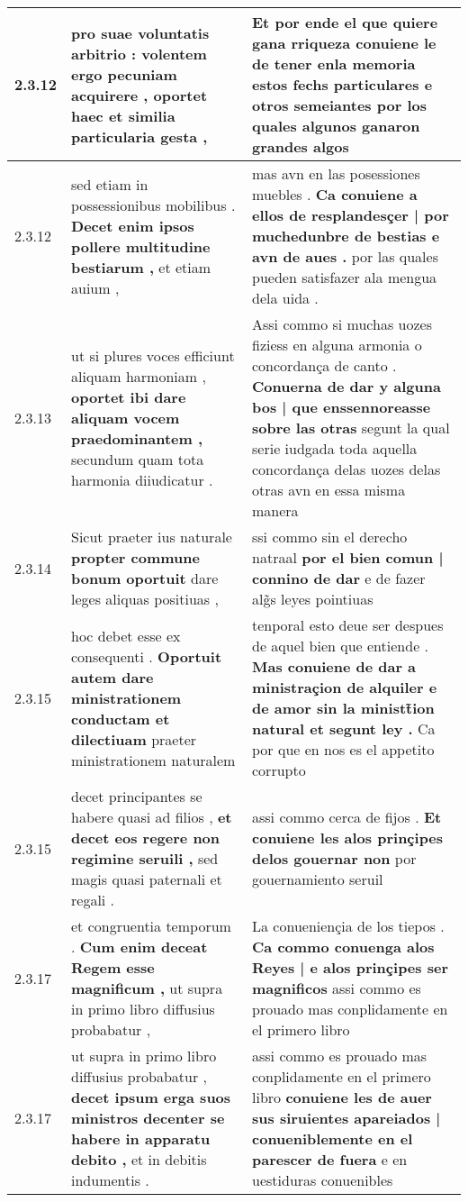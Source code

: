 \begin{tabular}{|p{1cm}|p{6.5cm}|p{6.5cm}|}
2.3.12 & pro suae voluntatis arbitrio : volentem ergo pecuniam acquirere , \textbf{ oportet haec } et similia particularia gesta , & Et por ende el que quiere gana rriqueza \textbf{ conuiene le de tener enla memoria estos fechs particulares e otros semeiantes } por los quales algunos ganaron grandes algos \\\hline
2.3.12 & sed etiam in possessionibus mobilibus . \textbf{ Decet enim ipsos pollere multitudine bestiarum , } et etiam auium , & mas avn en las posessiones muebles . \textbf{ Ca conuiene a ellos de resplandesçer | por muchedunbre de bestias e avn de aues . } por las quales pueden satisfazer ala mengua dela uida . \\\hline
2.3.13 & ut si plures voces efficiunt aliquam harmoniam , \textbf{ oportet ibi dare aliquam vocem praedominantem , } secundum quam tota harmonia diiudicatur . & Assi commo si muchas uozes fiziess en alguna armonia o concordança de canto . \textbf{ Conuerna de dar y alguna bos | que enssennoreasse sobre las otras } segunt la qual serie iudgada toda aquella concordança delas uozes delas otras avn en essa misma manera \\\hline
2.3.14 & Sicut praeter ius naturale \textbf{ propter commune bonum oportuit } dare leges aliquas positiuas , & ssi commo sin el derecho natraal \textbf{ por el bien comun | connino de dar } e de fazer alg̃s leyes pointiuas \\\hline
2.3.15 & hoc debet esse ex consequenti . \textbf{ Oportuit autem dare ministrationem conductam et dilectiuam } praeter ministrationem naturalem & tenporal esto deue ser despues de aquel bien que entiende . \textbf{ Mas conuiene de dar a ministraçion de alquiler e de amor sin la ministt̃ion natural et segunt ley . } Ca por que en nos es el appetito corrupto \\\hline
2.3.15 & decet principantes se habere quasi ad filios , \textbf{ et decet eos regere non regimine seruili , } sed magis quasi paternali et regali . & assi commo cerca de fijos . \textbf{ Et conuiene les alos prinçipes delos gouernar non } por gouernamiento seruil \\\hline
2.3.17 & et congruentia temporum . \textbf{ Cum enim deceat Regem esse magnificum , } ut supra in primo libro diffusius probabatur , & La conueniençia de los tiepos . \textbf{ Ca commo conuenga alos Reyes | e alos prinçipes ser magnificos } assi commo es prouado mas conplidamente en el primero libro \\\hline
2.3.17 & ut supra in primo libro diffusius probabatur , \textbf{ decet ipsum erga suos ministros decenter se habere in apparatu debito , } et in debitis indumentis . & assi commo es prouado mas conplidamente en el primero libro \textbf{ conuiene les de auer sus siruientes apareiados | conueniblemente en el parescer de fuera } e en uestiduras conuenibles \\\hline

\end{tabular}
